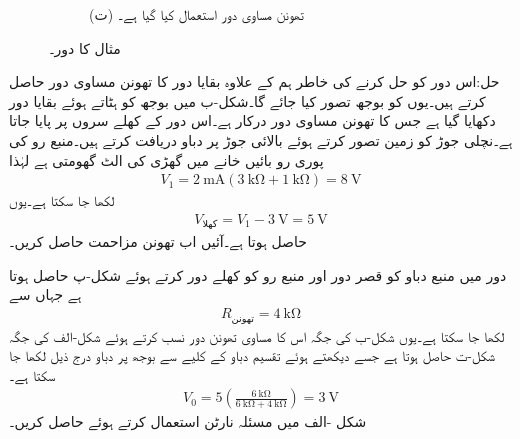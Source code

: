 \begin{figure}
\begin{subfigure}{1\textwidth}
\caption*{(ت) تھونن مساوی دور استعمال کیا گیا ہے۔}
\end{subfigure}
\caption{مثال  کا دور۔}
\label{شکل_مسئلہ__مثال_تھونن_الف}
\end{figure}

حل:اس دور کو حل کرنے کی خاطر ہم   کے علاوہ بقایا دور کا تھونن مساوی دور حاصل کرتے ہیں۔یوں  کو بوجھ تصور کیا جائے گا۔شکل-ب میں بوجھ کو ہٹاتے ہوئے بقایا دور دکھایا گیا ہے جس کا تھونن مساوی دور درکار ہے۔اس دور کے کھلے سروں پر  پایا جاتا ہے۔نچلی جوڑ کو زمین تصور کرتے ہوئے بالائی جوڑ  پر دباو دریافت کرتے ہیں۔منبع رو کی پوری رو بائیں خانے میں گھڑی کی الٹ گھومتی ہے لہٰذا
\begin{align*}
V_1=\SI{2}{\milli\ampere} \left(\SI{3}{\kilo\ohm}+\SI{1}{\kilo\ohm}\right)=\SI{8}{\volt}
\end{align*}
لکھا جا سکتا ہے۔یوں
\begin{align*}
V_{\text{کھلا}}= V_1-\SI{3}{\volt}=\SI{5}{\volt}
\end{align*}
حاصل ہوتا ہے۔آئیں اب تھونن مزاحمت حاصل کریں۔

دور میں منبع دباو کو قصر دور اور منبع رو کو کھلے دور کرتے ہوئے شکل-پ حاصل ہوتا ہے جہاں سے
\begin{align*}
R_{\text{تھونن}}=\SI{4}{\kilo\ohm}
\end{align*}
لکھا جا سکتا ہے۔یوں شکل-ب کی جگہ اس کا مساوی تھونن دور نسب کرتے ہوئے شکل-الف کی جگہ شکل-ت حاصل ہوتا ہے جسے دیکھتے ہوئے  تقسیم دباو کے کلیے سے بوجھ پر دباو  درج ذیل لکھا جا سکتا ہے۔
\begin{align}
V_0=5\left(\frac{\SI{6}{\kilo\ohm}}{\SI{6}{\kilo\ohm}+\SI{4}{\kilo\ohm}}\right)=\SI{3}{\volt}
\end{align}
شکل -الف میں مسئلہ نارٹن استعمال کرتے ہوئے  حاصل کریں۔

